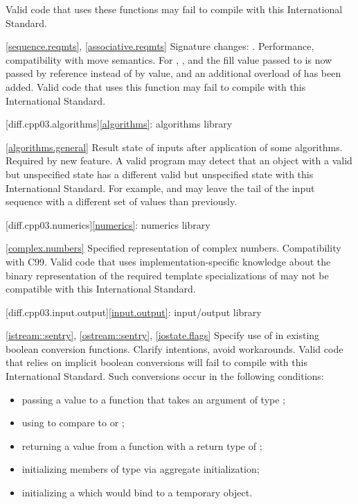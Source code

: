 Valid \CppIII code that uses these functions may fail to compile with this
International Standard.

\ref{sequence.reqmts}, \ref{associative.reqmts}
\change Signature changes: .
\rationale Performance, compatibility with move semantics.
\effect
For , , and 
the fill value passed to  is now passed by reference instead of
by value, and an additional overload of  has been added. Valid
\CppIII code that uses this function may fail to compile with this International
Standard.

[diff.cpp03.algorithms]{\ref{algorithms}: algorithms library}

\ref{algorithms.general}
\change Result state of inputs after application of some algorithms.
\rationale Required by new feature.
\effect
A valid \CppIII program may detect that an object with a valid but
unspecified state has a different valid but unspecified state with this
International Standard. For example,  and
 may leave the tail of the input sequence with a
different set of values than previously.

[diff.cpp03.numerics]{\ref{numerics}: numerics library}

\ref{complex.numbers}
\change Specified representation of complex numbers.
\rationale Compatibility with C99.
\effect
Valid \CppIII code that uses implementation-specific knowledge about the
binary representation of the required template specializations of
 may not be compatible with this International Standard.

[diff.cpp03.input.output]{\ref{input.output}: input/output library}

\ref{istream::sentry},
\ref{ostream::sentry},
\ref{iostate.flags}
\change Specify use of  in existing boolean conversion functions.
\rationale Clarify intentions, avoid workarounds.
\effect
Valid \CppIII code that relies on implicit boolean conversions will fail to
compile with this International Standard. Such conversions occur in the
following conditions:

\begin{itemize}
\item passing a value to a function that takes an argument of type ;
\item using  to compare to  or ;
\item returning a value from a function with a return type of ;
\item initializing members of type  via aggregate initialization;
\item initializing a  which would bind to a temporary object.
\end{itemize}


